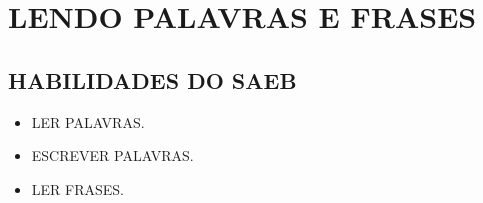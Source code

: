 \chapter{LENDO PALAVRAS E FRASES}

\section*{HABILIDADES DO SAEB}

\begin{itemize}
\item LER PALAVRAS.

\item ESCREVER PALAVRAS.

\item LER FRASES.
\end{itemize}


